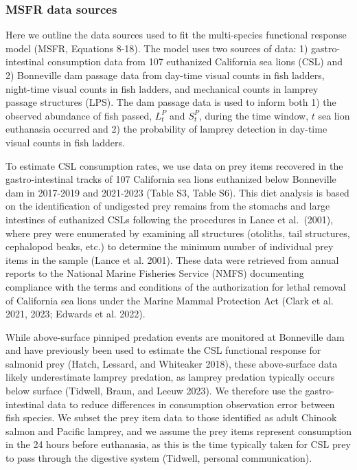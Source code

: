 \documentclass[
]{article}
\begin{document}
\newpage

\subsubsection{MSFR data sources}\label{msfr-data-sources}

Here we outline the data sources used to fit the multi-species
functional response model (MSFR, Equations 8-18). The model uses two
sources of data: 1) gastro-intestinal consumption data from 107
euthanized California sea lions (CSL) and 2) Bonneville dam passage data
from day-time visual counts in fish ladders, night-time visual counts in
fish ladders, and mechanical counts in lamprey passage structures (LPS).
The dam passage data is used to inform both 1) the observed abundance of
fish passed, \(L^P_t\) and \(S^P_t\), during the time window, \(t\) sea
lion euthanasia occurred and 2) the probability of lamprey detection in
day-time visual counts in fish ladders.

To estimate CSL consumption rates, we use data on prey items recovered
in the gastro-intestinal tracks of 107 California sea lions euthanized
below Bonneville dam in 2017-2019 and 2021-2023 (Table S3, Table S6).
This diet analysis is based on the identification of undigested prey
remains from the stomachs and large intestines of euthanized CSLs
following the procedures in Lance et al.~(2001), where prey were
enumerated by examining all structures (otoliths, tail structures,
cephalopod beaks, etc.) to determine the minimum number of individual
prey items in the sample (Lance et al. 2001). These data were retrieved
from annual reports to the National Marine Fisheries Service (NMFS)
documenting compliance with the terms and conditions of the
authorization for lethal removal of California sea lions under the
Marine Mammal Protection Act (Clark et al. 2021, 2023; Edwards et al.
2022).

While above-surface pinniped predation events are monitored at
Bonneville dam and have previously been used to estimate the CSL
functional response for salmonid prey (Hatch, Lessard, and Whiteaker
2018), these above-surface data likely underestimate lamprey predation,
as lamprey predation typically occurs below surface (Tidwell, Braun, and
Leeuw 2023). We therefore use the gastro-intestinal data to reduce
differences in consumption observation error between fish species. We
subset the prey item data to those identified as adult Chinook salmon
and Pacific lamprey, and we assume the prey items represent consumption
in the 24 hours before euthanasia, as this is the time typically taken
for CSL prey to pass through the digestive system (Tidwell, personal
communication).
\end{document}
